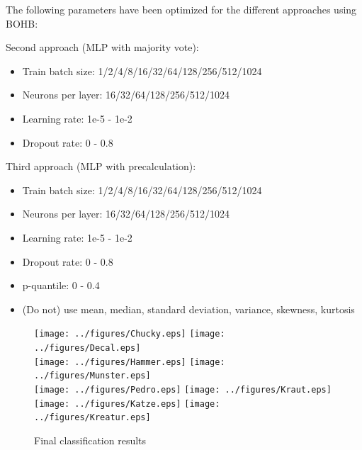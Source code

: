 \documentclass{article}
\begin{document}
The following parameters have been optimized for the different approaches using BOHB: 

Second approach (MLP with majority vote):
\begin{itemize}
\item Train batch size: 1/2/4/8/16/32/64/128/256/512/1024
\item Neurons per layer: 16/32/64/128/256/512/1024
\item Learning rate: 1e-5 - 1e-2
\item Dropout rate: 0 - 0.8
\end{itemize}

Third approach (MLP with precalculation):
%
\begin{itemize}
\item Train batch size: 1/2/4/8/16/32/64/128/256/512/1024
\item Neurons per layer: 16/32/64/128/256/512/1024
\item Learning rate: 1e-5 - 1e-2
\item Dropout rate: 0 - 0.8
\item p-quantile: 0 - 0.4
\item (Do not) use mean, median, standard deviation, variance, skewness, kurtosis
\end{itemize}
%

\begin{figure}[!ht]
   \begin{minipage}{\linewidth}
   \centering
   \texttt{[image: ../figures/Chucky.eps]}
   \texttt{[image: ../figures/Decal.eps]}\\
	 \texttt{[image: ../figures/Hammer.eps]}
   \texttt{[image: ../figures/Munster.eps]}\\
	 \texttt{[image: ../figures/Pedro.eps]}
   \texttt{[image: ../figures/Kraut.eps]}\\
   \texttt{[image: ../figures/Katze.eps]}
   \texttt{[image: ../figures/Kreatur.eps]}
   \caption{Final classification results}
   \label{fig:results}
	 \end{minipage}
\end{figure}
\end{document}
